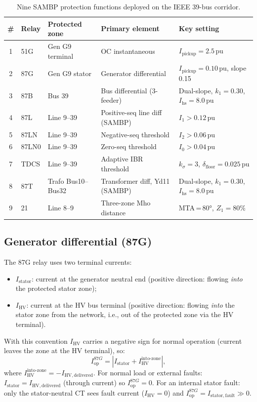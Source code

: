 \documentclass[12pt,a4paper]{article}
\newcommand{\Iop}{I_{\mathrm{op}}}
\begin{document}
\begin{table}[H]
\centering
\caption{Nine SAMBP protection functions deployed on the IEEE 39-bus corridor.}
\label{tab:relay_config}
\setlength{\tabcolsep}{5pt}
\begin{tabular}{cllll}
\toprule
\# & Relay & Protected zone & Primary element & Key setting \\
\midrule
1 & 51G   & Gen G9 terminal   & OC instantaneous & $I_{\mathrm{pickup}} = 2.5$\,pu \\
2 & 87G   & Gen G9 stator     & Generator differential & $I_{\mathrm{pickup}} = 0.10$\,pu, slope 0.15 \\
3 & 87B   & Bus 39            & Bus differential (3-feeder) & Dual-slope, $k_1=0.30$, $I_{\mathrm{hs}}=8.0$\,pu \\
4 & 87L   & Line 9--39        & Positive-seq line diff (SAMBP) & $I_1 > 0.12$\,pu \\
5 & 87LN  & Line 9--39        & Negative-seq threshold & $I_2 > 0.06$\,pu \\
6 & 87LN0 & Line 9--39        & Zero-seq threshold & $I_0 > 0.04$\,pu \\
7 & TDCS  & Line 9--39        & Adaptive IBR threshold & $k_\sigma = 3$, $\delta_{\mathrm{floor}} = 0.025$\,pu \\
8 & 87T   & Trafo Bus10--Bus32 & Transformer diff, Yd11 (SAMBP) & Dual-slope, $k_1=0.30$, $I_{\mathrm{hs}}=8.0$\,pu \\
9 & 21    & Line 8--9         & Three-zone Mho distance & MTA\,=\,80°, $Z_1=80\%$ \\
\bottomrule
\end{tabular}
\end{table}

\subsection{Generator differential (87G)}
\label{sec:87g}

The 87G relay uses two terminal currents:
\begin{itemize}
  \item $I_{\mathrm{stator}}$: current at the generator neutral end (positive
    direction: flowing \emph{into} the protected stator zone);
  \item $I_{\mathrm{HV}}$: current at the HV bus terminal (positive direction:
    flowing \emph{into} the stator zone from the network, i.e., out of the
    protected zone via the HV terminal).
\end{itemize}
With this convention $I_{\mathrm{HV}}$ carries a negative sign for normal
operation (current leaves the zone at the HV terminal), so:
\begin{equation}
  \Iop^{87G} = \left|I_{\mathrm{stator}} + I_{\mathrm{HV}}^{\mathrm{into\text{-}zone}}\right|,
\end{equation}
where $I_{\mathrm{HV}}^{\mathrm{into\text{-}zone}} = -I_{\mathrm{HV,delivered}}$.
For normal load or external faults: $I_{\mathrm{stator}} = I_{\mathrm{HV,delivered}}$
(through current) so $\Iop^{87G} = 0$.
For an internal stator fault: only the stator-neutral CT sees fault current
($I_{\mathrm{HV}} = 0$) and $\Iop^{87G} = I_{\mathrm{stator,fault}} \gg 0$.
\end{document}
